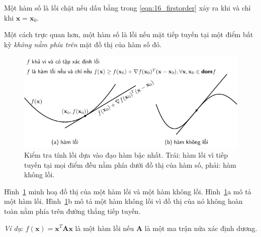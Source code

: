 Một hàm số là lồi chặt nếu dấu bằng trong \eqref{eqn:16_firstorder} xảy ra khi và chỉ khi $\mathbf{x} = \mathbf{x}_0$.

Một cách trực quan hơn, một hàm số là lồi nếu mặt tiếp tuyến tại một điểm
bất kỳ \textit{không nằm phía trên} mặt đồ thị của hàm số đó.




\begin{figure}[t]
\centering
\includegraphics[width = \textwidth]{Chapters/08_ConvexOptimization/16_convexity/latex/first_order.pdf}
\caption[]{Kiểm tra tính lồi dựa vào đạo hàm bậc nhất. Trái: hàm lồi vì tiếp tuyến tại mọi điểm đều nằm phía dưới đồ thị của hàm số, phải: hàm không lồi.}
\label{fig:16_firstorder}
\end{figure}

Hình~\ref{fig:16_firstorder} minh hoạ đồ thị của một hàm lồi và một hàm không
lồi. Hình~\ref{fig:16_firstorder}a mô tả một hàm lồi.
Hình~\ref{fig:16_firstorder}b mô tả một hàm không lồi vì đồ thị của nó không hoàn toàn nằm phía trên đường thẳng tiếp tuyến.

\textit{Ví dụ}: $f(\mathbf{x}) = \mathbf{x}^T\mathbf{A}\mathbf{x}$ là một hàm lồi nếu  $\mathbf{A}$ là một ma trận {nửa xác định dương}.

